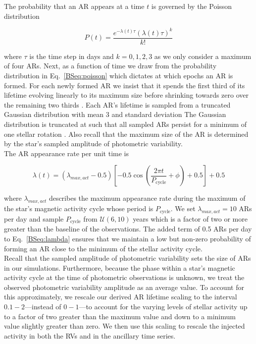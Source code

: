The probability that an AR appears at a time $t$ is governed by the Poisson distribution

\begin{equation}
  P(t) = \frac{e^{-\lambda(t) \tau} (\lambda(t) \tau)^k}{k!} \label{BSeq:poisson}
\end{equation}

\noindent where $\tau$ is the time step in days and $k=0,1,2,3$ as we only consider a maximum of
four ARs. Next, as a function of time we draw from the probability distribution in Eq.~\ref{BSeq:poisson} 
which dictates at which epochs an AR is formed. For each newly formed AR 
we insist that it spends the first third of its lifetime evolving linearly to its maximum size before
shrinking towards zero over the remaining two thirds \citep{dumusque16a}.
Each AR's lifetime is sampled from a truncated Gaussian distribution with mean 3\prot{} and standard
deviation  The Gaussian distribution is truncated at \prot{} such that all sampled ARs persist
for a minimum of one stellar rotation \citep[e.g.][]{bonfils07,forveille09,hebrard16}.
Also recall that the maximum size of the AR is determined by the star's sampled amplitude of photometric
variability. \\

The AR appearance rate per unit time is

\begin{equation}
  \lambda(t) = (\lambda_{max,act} - 0.5) \left[ -0.5 \cos{\left( \frac{2\pi t}{P_{\text{cycle}}} + \phi \right)} + 0.5 \right] + 0.5
\label{BSeq:lambda}
\end{equation}

\noindent where $\lambda_{max,act}$ describes the maximum appearance rate during the maximum of the star's
magnetic activity cycle whose period is $P_{\text{cycle}}$. We set $\lambda_{max,act}=10$ ARs per day and sample
$P_{\text{cycle}}$ from $\mathcal{U}(6,10)$ years \citep{mascareno16, wargelin17} which is a factor of two or more
greater than the baseline of the observations. The added term of 0.5 ARs per day
to Eq.~\ref{BSeq:lambda} ensures that we maintain a low but non-zero probability of forming an AR close to the
minimum of the stellar activity cycle. \\

Recall that the sampled amplitude of photometric variability sets the size of ARs in our simulations.
Furthermore, because the phase within a star's magnetic activity cycle at the time of photometric observations
is unknown, we treat the observed photometric variability amplitude as an average value. To account for this
approximately, we rescale our
derived AR lifetime scaling to the interval $0.1-2$---instead of $0-1$---to account for the varying levels of
stellar activity up to a factor of two greater than the maximum value and down to a minimum value slightly greater
than zero. We then use this scaling to rescale the injected activity in both the RVs and in the ancillary time series. \\

